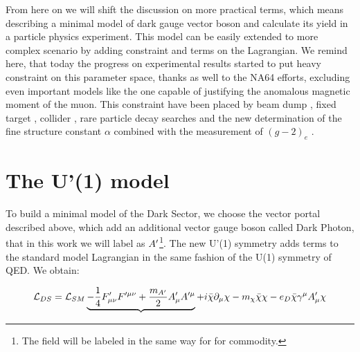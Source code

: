 From here on we will shift the discussion on more practical terms, which means describing a minimal model of dark gauge vector boson and calculate its yield in a particle physics experiment. This model can be easily extended to more complex scenario by adding constraint and terms on the Lagrangian. We remind here, that today the progress on experimental results started to put heavy constraint on this parameter space, thanks as well to the NA64 efforts, excluding even important models like the one capable of justifying the anomalous magnetic moment of the muon. This constraint have been placed by beam dump \cite{jdb, charm, rio, e137, konaka, bross, dav,  ath, nomad, e787, essig1, blum,sg1, blum1, sarah1}, fixed target \cite{apex,merkel,merkel1}, collider \cite{babar, curt, babar1}, rare particle decay searches \cite{sindrum, kloe, sg2, kloe2, wasa, hades, phenix, e949, na48, pol, kloe3} and the new determination of the fine structure constant $\alpha$ combined with the measurement of $(g-2)_e$ \cite{Parker191,PhysRevLett.100.120801}.

\section{The U'(1) model}
\label{ch1:sec:dm-u1model}

To build a minimal model of the Dark Sector, we choose the vector portal described above, which add an additional vector gauge boson called Dark Photon, that in this work we will label as $A'$\footnote{The field will be labeled in the same way for for commodity.}. The new U'(1) symmetry adds terms to the standard model Lagrangian in the same fashion of the U(1) symmetry of QED. We obtain:

\begin{equation}
  \label{eq:dm-lagrangian}
  \mathcal{L}_{DS} = \mathcal{L}_{SM} \underbrace{- \frac{1}{4}F'_{\mu \nu}F'^{\mu \nu} + \frac{m_{A'}}{2}A'_{\mu}A'^{\mu}} + i \bar{\chi} \partial_{\mu} \chi - m_{\chi}\bar{\chi}\chi - e_D \bar{\chi}\gamma^{\mu}A'_{\mu}\chi
\end{equation}

